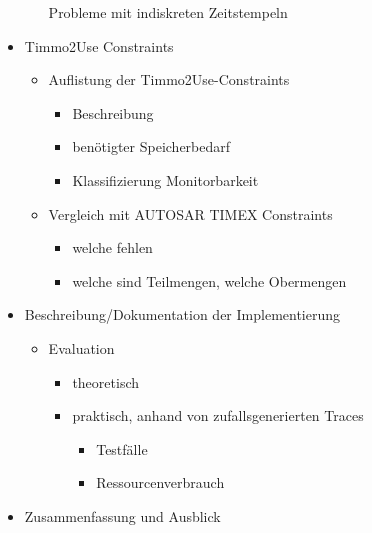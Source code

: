 \documentclass[]{article}
\begin{document}
\begin{itemize}
\begin{itemize}
				Probleme mit indiskreten Zeitstempeln
		\end{itemize}
	\item
		Timmo2Use Constraints
		\begin{itemize}
			\item
				Auflistung der Timmo2Use-Constraints
				\begin{itemize}
					\item
						Beschreibung
					\item
						benötigter Speicherbedarf
					\item
						Klassifizierung Monitorbarkeit
				\end{itemize}
			\item
				Vergleich mit AUTOSAR TIMEX Constraints
				\begin{itemize}
					\item
						welche fehlen
					\item
						welche sind Teilmengen, welche Obermengen 
				\end{itemize}
		\end{itemize}
	\item
		Beschreibung/Dokumentation der Implementierung
		\begin{itemize}
			\item
				Evaluation
				\begin{itemize}
					\item
						theoretisch
					\item
						praktisch, anhand von zufallsgenerierten Traces
						\begin{itemize}
							\item
								Testfälle
							\item
								Ressourcenverbrauch
						\end{itemize}
				\end{itemize}
		\end{itemize}
	\item
		Zusammenfassung und Ausblick
\end{itemize}
\end{document}
